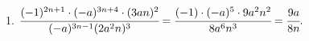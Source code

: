 1. $\cfrac{(-1)^{2n+1}\cdot(-a)^{3n+4}\cdot(3an)^2}{(-a)^{3n-1}(2a^2n)^3}=
\cfrac{(-1)\cdot(-a)^{5}\cdot9a^2n^2}{8a^6n^3}=\cfrac{9a}{8n}.$\\
